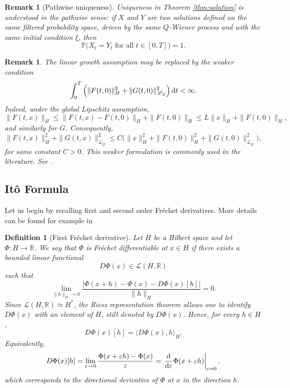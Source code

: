 \documentclass[12pt]{amsart}
\newcommand{\D}[1]{\mbox{\rm #1}}
\newcommand{\dd}{\D{d}}
\numberwithin{equation}{section}
\newtheorem{remark}[theorem]{Remark}
\newtheorem{definition}[theorem]{Definition}
\begin{document}
\begin{remark}[Pathwise uniqueness]\label{rmk:uniq}
Uniqueness in Theorem \ref{thm:solution} is understood in the pathwise sense: if $X$ and $Y$ are two solutions defined on the same filtered probability space, driven by the same $Q$-Wiener process and with the same initial condition $\xi$, then
\[
    \mathbb P\big(X_t = Y_t \text{ for all } t\in[0,T]\big)=1.
\]
\end{remark}

\begin{remark}
The linear growth assumption may be replaced by the weaker condition
\[
    \int_0^T \Big( \|F(t,0)\|_H^2 + \|G(t,0)\|_{\mathscr L_Q}^2 \Big)\,\dd t <\infty.
\]
Indeed, under the global Lipschitz assumption,
\[
    \|F(t,x)\|_H \le \|F(t,x)-F(t,0)\|_H + \|F(t,0)\|_H \le L\|x\|_H + \|F(t,0)\|_H,
\]
and similarly for $G$. Consequently,
\[
    \|F(t,x)\|_H^2 + \|G(t,x)\|_{\mathscr L_Q}^2 \le C\Big( \|x\|_H^2 + \|F(t,0)\|_H^2 + \|G(t,0)\|_{\mathscr L_Q}^2 \Big),
\]
for some constant $C>0$. This weaker formulation is commonly used in the literature. See \cite[page 205]{chow2007stochastic}.
\end{remark}




\subsection{It\^{o} Formula}

Let us begin by recalling first and second order Fr\'echet derivatives. More details can be found for example in \cite[\S 2.2]{bonnans2013perturbation}

\begin{definition}[First Fr\'echet derivative]
Let $H$ be a Hilbert space and let $\Phi:H\to\mathbb{R}$. We say that $\Phi$ is Fr\'echet differentiable at $x\in H$ if there exists a bounded linear functional
\[
D\Phi(x)\in \mathscr L(H,\mathbb{R})
\]
such that
\[
    \lim_{\|h\|_H\to0} \frac{|\Phi(x+h)-\Phi(x)-D\Phi(x)[h]|}{\|h\|_H} = 0.
\]
Since $\mathscr L(H,\mathbb{R}) \simeq H^*$, 
the Riesz representation theorem allows one to identify $D\Phi(x)$ with an element of $H$, still denoted by $D\Phi(x)$. Hence, for every $h\in H$,
\[
    D\Phi(x)[h] = \langle D\Phi(x),h\rangle_H.
\]
Equivalently,
\[
    D\Phi(x)[h] = \lim_{\varepsilon\to0} \frac{\Phi(x+\varepsilon h)-\Phi(x)}{\varepsilon}  = \left. \frac{\dd}{\dd\varepsilon} \Phi(x+\varepsilon h) \right|_{\varepsilon=0},
\]
which corresponds to the directional derivative of $\Phi$ at $x$ in the direction $h$.
\end{definition}
\end{document}
